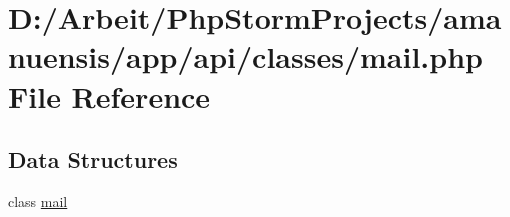 \hypertarget{a00067}{}\section{D\+:/\+Arbeit/\+Php\+Storm\+Projects/amanuensis/app/api/classes/mail.php File Reference}
\label{a00067}
\subsection*{Data Structures}
\begin{DoxyCompactItemize}
\item 
class \hyperlink{a00031}{mail}
\end{DoxyCompactItemize}
